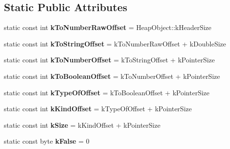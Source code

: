 \subsection*{Static Public Attributes}
\begin{DoxyCompactItemize}
\item 
static const int {\bfseries k\+To\+Number\+Raw\+Offset} = Heap\+Object\+::k\+Header\+Size\hypertarget{classv8_1_1internal_1_1_oddball_a359c026098ad7b1d1c64b5d80e139ffd}{}\label{classv8_1_1internal_1_1_oddball_a359c026098ad7b1d1c64b5d80e139ffd}

\item 
static const int {\bfseries k\+To\+String\+Offset} = k\+To\+Number\+Raw\+Offset + k\+Double\+Size\hypertarget{classv8_1_1internal_1_1_oddball_aa6a9637c9e8da1a28f83c788c1027013}{}\label{classv8_1_1internal_1_1_oddball_aa6a9637c9e8da1a28f83c788c1027013}

\item 
static const int {\bfseries k\+To\+Number\+Offset} = k\+To\+String\+Offset + k\+Pointer\+Size\hypertarget{classv8_1_1internal_1_1_oddball_a15f1533c8dc4c622d3a14c291103d5e3}{}\label{classv8_1_1internal_1_1_oddball_a15f1533c8dc4c622d3a14c291103d5e3}

\item 
static const int {\bfseries k\+To\+Boolean\+Offset} = k\+To\+Number\+Offset + k\+Pointer\+Size\hypertarget{classv8_1_1internal_1_1_oddball_afd31936290ee07b07a8ba5f581646836}{}\label{classv8_1_1internal_1_1_oddball_afd31936290ee07b07a8ba5f581646836}

\item 
static const int {\bfseries k\+Type\+Of\+Offset} = k\+To\+Boolean\+Offset + k\+Pointer\+Size\hypertarget{classv8_1_1internal_1_1_oddball_a0df5c29f24ad428f01022a78853b89ce}{}\label{classv8_1_1internal_1_1_oddball_a0df5c29f24ad428f01022a78853b89ce}

\item 
static const int {\bfseries k\+Kind\+Offset} = k\+Type\+Of\+Offset + k\+Pointer\+Size\hypertarget{classv8_1_1internal_1_1_oddball_a3aa86ed02d356c506c27a284e683b865}{}\label{classv8_1_1internal_1_1_oddball_a3aa86ed02d356c506c27a284e683b865}

\item 
static const int {\bfseries k\+Size} = k\+Kind\+Offset + k\+Pointer\+Size\hypertarget{classv8_1_1internal_1_1_oddball_a94ef696c3fd95d44b6ace00ae799d890}{}\label{classv8_1_1internal_1_1_oddball_a94ef696c3fd95d44b6ace00ae799d890}

\item 
static const byte {\bfseries k\+False} = 0\hypertarget{classv8_1_1internal_1_1_oddball_a3556ea40330ca7f13d1546b9a5ab278c}{}\label{classv8_1_1internal_1_1_oddball_a3556ea40330ca7f13d1546b9a5ab278c}


\end{DoxyCompactItemize}
